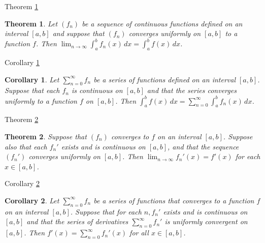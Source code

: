 \documentclass[avery5371,grid]{flashcards}
\newtheorem{corollary}{Corollary}
\newtheorem{theorem}{Theorem}
\begin{document}
\begin{flashcard}[Theorem]{Theorem \ref{thm118}}
\begin{theorem}
\label{thm118}
Let $(f_n)$ be a sequence of continuous functions defined on an
interval $[a,b]$ and suppose that $(f_n)$ converges uniformly on $[a,b]$ to a
function $f$.  Then $\displaystyle \lim _{n \to \infty} \int _a ^b f_n(x) \, dx
= \int _a ^b f(x) \, dx$.
\end{theorem}
\end{flashcard}

\begin{flashcard}[Corollary]{Corollary \ref{cor9}}
\begin{corollary}
\label{cor9}
Let $\displaystyle \sum _{n=0} ^{\infty} f_n$ be a series of
functions defined on an interval $[a,b]$.  Suppose that each $f_n$ is continuous
on $[a,b]$ and that the series converges uniformly to a function $f$ on $[a,b]$.
 Then $\displaystyle \int _a ^b f(x) \, dx = \sum _{n=0}^{\infty} \int _a ^b
f_n(x) \, dx$.
\end{corollary}
\end{flashcard}

\begin{flashcard}[Theorem]{Theorem \ref{thm119}}
\begin{theorem}
\label{thm119}
Suppose that $(f_n)$ converges to $f$ on an interval $[a,b]$. 
Suppose also that each $f_n'$ exists and is continuous on $[a,b]$, and that the
sequence $(f_n')$ converges uniformly on $[a,b]$.  Then $\displaystyle \lim _{n
\to \infty} f_n'(x) = f'(x)$ for each $x \in [a,b]$.
\end{theorem}
\end{flashcard}

\begin{flashcard}[Corollary]{Corollary \ref{cor10}}
\begin{corollary}
\label{cor10}
Let $\displaystyle \sum _{n = 0}^{\infty} f_n$ be a series of
functions that converges to a function $f$ on an interval $[a,b]$.  Suppose that
for each $n, f_n'$ exists and is continuous on $[a,b]$ and that the series of
derivatives $\displaystyle \sum _{n=0}^{\infty} f_n'$ is uniformly convergent on
$[a,b]$.  Then $\displaystyle f'(x) = \sum _{n=0}^{\infty} f_n'(x)$ for all $x
\in [a,b]$.
\end{corollary}
\end{flashcard}
\end{document}
